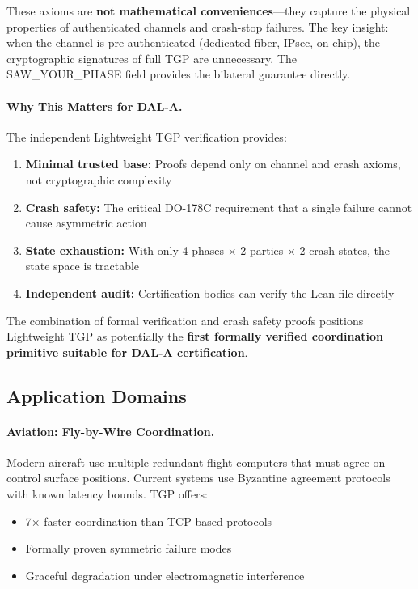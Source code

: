 These axioms are \textbf{not mathematical conveniences}---they capture the physical properties of authenticated channels and crash-stop failures. The key insight: when the channel is pre-authenticated (dedicated fiber, IPsec, on-chip), the cryptographic signatures of full TGP are unnecessary. The SAW\_YOUR\_PHASE field provides the bilateral guarantee directly.

\paragraph{Why This Matters for DAL-A.}
The independent Lightweight TGP verification provides:

\begin{enumerate}
    \item \textbf{Minimal trusted base:} Proofs depend only on channel and crash axioms, not cryptographic complexity
    \item \textbf{Crash safety:} The critical DO-178C requirement that a single failure cannot cause asymmetric action
    \item \textbf{State exhaustion:} With only 4 phases $\times$ 2 parties $\times$ 2 crash states, the state space is tractable
    \item \textbf{Independent audit:} Certification bodies can verify the Lean file directly
\end{enumerate}

\noindent The combination of formal verification and crash safety proofs positions Lightweight TGP as potentially the \textbf{first formally verified coordination primitive suitable for DAL-A certification}.

\subsection{Application Domains}

\paragraph{Aviation: Fly-by-Wire Coordination.}
Modern aircraft use multiple redundant flight computers that must agree on control surface positions. Current systems use Byzantine agreement protocols with known latency bounds. TGP offers:
\begin{itemize}
    \item 7$\times$ faster coordination than TCP-based protocols
    \item Formally proven symmetric failure modes
    \item Graceful degradation under electromagnetic interference
\end{itemize}

